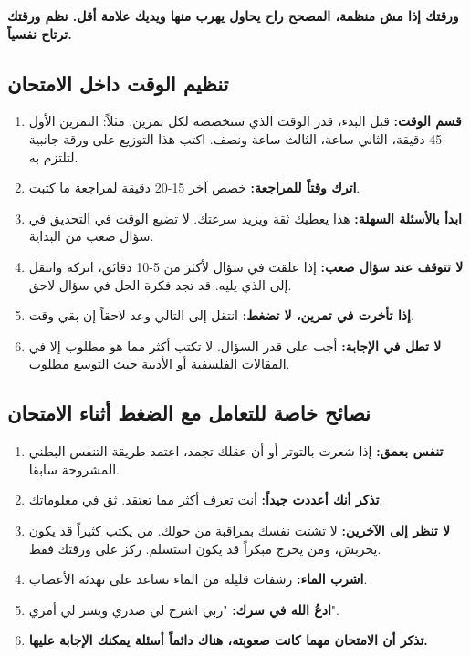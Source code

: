 \documentclass[12pt,a4paper]{book}
\newcommand{\importantAr}[1]{%
	\begin{important}
		\bfseries #1
	\end{important}
}
\begin{document}
	\importantAr{ورقتك إذا مش منظمة، المصحح راح يحاول يهرب منها ويديك علامة أقل. نظم ورقتك ترتاح نفسياً.}
	
	\subsection{تنظيم الوقت داخل الامتحان}
	\begin{enumerate}
		\item \textbf{قسم الوقت:} قبل البدء، قدر الوقت الذي ستخصصه لكل تمرين. مثلاً: التمرين الأول 45 دقيقة، الثاني ساعة، الثالث ساعة ونصف. اكتب هذا التوزيع على ورقة جانبية لتلتزم به.
		\item \textbf{اترك وقتاً للمراجعة:} خصص آخر 15-20 دقيقة لمراجعة ما كتبت.
		\item \textbf{ابدأ بالأسئلة السهلة:} هذا يعطيك ثقة ويزيد سرعتك. لا تضيع الوقت في التحديق في سؤال صعب من البداية.
		\item \textbf{لا تتوقف عند سؤال صعب:} إذا علقت في سؤال لأكثر من 5-10 دقائق، اتركه وانتقل إلى الذي يليه. قد تجد فكرة الحل في سؤال لاحق.
		\item \textbf{إذا تأخرت في تمرين، لا تضغط:} انتقل إلى التالي وعد لاحقاً إن بقي وقت.
		\item \textbf{لا تطل في الإجابة:} أجب على قدر السؤال. لا تكتب أكثر مما هو مطلوب إلا في المقالات الفلسفية أو الأدبية حيث التوسع مطلوب.
	\end{enumerate}
	
	\subsection{نصائح خاصة للتعامل مع الضغط أثناء الامتحان}
	\label{sec:random-tips19}
	\begin{enumerate}
		\item \textbf{تنفس بعمق:} إذا شعرت بالتوتر أو أن عقلك تجمد، اعتمد طريقة التنفس البطني المشروحة سابقا.
		\item \textbf{تذكر أنك أعددت جيداً:} أنت تعرف أكثر مما تعتقد. ثق في معلوماتك.
		\item \textbf{لا تنظر إلى الآخرين:} لا تشتت نفسك بمراقبة من حولك. من يكتب كثيراً قد يكون يخربش، ومن يخرج مبكراً قد يكون استسلم. ركز على ورقتك فقط.
		\item \textbf{اشرب الماء:} رشفات قليلة من الماء تساعد على تهدئة الأعصاب.
		\item \textbf{ادعُ الله في سرك:} "ربي اشرح لي صدري ويسر لي أمري".
		\item \textbf{تذكر أن الامتحان مهما كانت صعوبته، هناك دائماً أسئلة يمكنك الإجابة عليها.}
	\end{enumerate}
	
\end{document}
